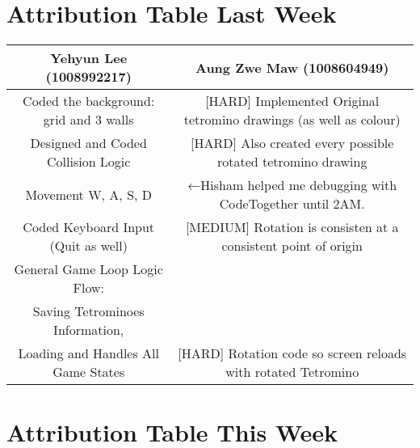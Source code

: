 \documentclass{article}
\begin{document}
\section{Attribution Table Last Week}



\begin{center}
\begin{tabular}{|| c | c ||}
\hline
 Yehyun Lee (1008992217) &  Aung Zwe Maw (1008604949) \\ 
 \hline
 [MEDIUM] Coded the background: grid and 3 walls & [HARD] Implemented Original tetromino drawings (as well as colour)\\
 \hline
 [HARD] Designed and Coded Collision Logic & [HARD] Also created every possible rotated tetromino drawing\\
 \hline
 [HARD] Movement W, A, S, D & ←Hisham helped me debugging with CodeTogether until 2AM.\\ 
 \hline
 [EASY] Coded Keyboard Input (Quit as well) & [MEDIUM] Rotation is consisten at a consistent point of origin\\ 
 \hline
 [HARD] General Game Loop Logic Flow:\\Saving Tetrominoes Information,\\
 Loading and Handles All Game States & [HARD] Rotation code so screen reloads with rotated Tetromino\\
 \hline
\end{tabular}









\section{Attribution Table This Week}


\end{center}
\end{document}
